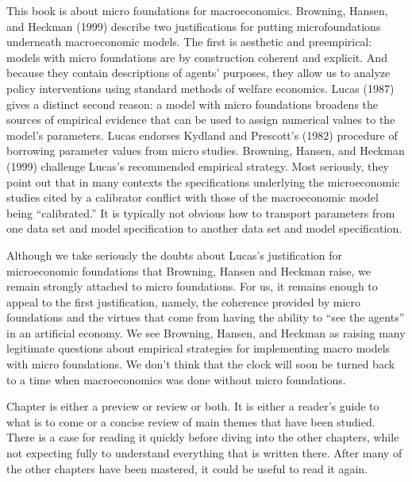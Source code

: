 
\noindent This book is  about micro foundations for macroeconomics.
Browning, Hansen, and Heckman (1999) describe two justifications
for putting microfoundations underneath macroeconomic models.
The first is  aesthetic and preempirical: models with micro foundations
are by construction coherent and explicit.   And because they
contain descriptions of agents' purposes, they  allow us to
analyze policy interventions using standard methods of welfare
economics.    Lucas (1987) gives a distinct second reason:
%
       a model with micro foundations     broadens the
sources of empirical evidence that can be used to
assign numerical values to  the model's parameters.    Lucas
endorses  Kydland and Prescott's (1982) procedure of
borrowing parameter values from micro studies.   Browning, Hansen,
and Heckman (1999)  challenge
Lucas's recommended  empirical strategy.
Most seriously, they point out that  in many contexts the
specifications underlying the microeconomic studies  cited by
a calibrator
conflict with those of  the macroeconomic  model being
``calibrated.''    It is typically not obvious how
to transport parameters from one data set and model specification
to another data set and model specification.
 


  Although we take seriously the doubts
about Lucas's justification for microeconomic foundations
that
Browning, Hansen and  Heckman raise, we remain strongly attached
to micro foundations. For us, it remains enough
to appeal to the first justification, namely, the coherence provided
by micro foundations and the virtues that come from
having the ability to ``see the agents'' in
an artificial economy.
  We see Browning,  Hansen, and  Heckman as raising
 many legitimate
questions about empirical strategies for implementing
macro models with micro foundations.
We don't think that the clock will soon be turned back to a time
when macroeconomics was done without
micro foundations.




\noindent Chapter  is either a preview or review or both. It is either a reader's guide to what is to come or a concise review of main themes
  that have been studied.  There is a case for
reading it quickly before diving into the other chapters, while not expecting fully to understand everything
that is written there. After many of the other chapters have been mastered, it could be useful to read it again.

